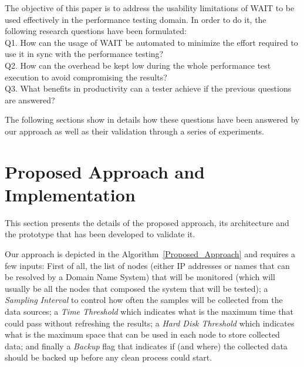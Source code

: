 \documentclass[runningheads,a4paper]{llncs}
\begin{document}
The objective of this paper is to address the usability limitations of WAIT to
be used effectively in the performance testing domain. In order to do it, the
following research questions have been formulated:
\\Q1. How can the usage of WAIT be automated to minimize the effort
required to use it in sync with the performance testing?
\\Q2. How can the overhead be kept low during the whole performance test
execution to avoid compromising the results? 
\\Q3. What benefits in productivity can a tester achieve if the previous
questions are answered?

The following sections show in details how these questions have been answered by
our approach as well as their validation through a series of experiments.


\section{Proposed Approach and Implementation}

This section presents the details of the proposed approach, its architecture
and the prototype that has been developed to validate it.

Our approach is depicted in the Algorithm~\ref{Proposed_Approach} and requires
a few inputs: First of all, the list of nodes (either IP addresses or names that
can be resolved by a Domain Name System) that will be monitored (which
will usually be all the nodes that composed the system that will be tested); a
\emph{Sampling Interval} to control how often the samples will be collected
from the data sources; a \emph{Time Threshold} which indicates what is the
maximum time that could pass without refreshing the results; a \emph{Hard Disk
Threshold} which indicates what is the maximum space that can be used in each
node to store collected data; and finally a \emph{Backup} flag that indicates if
(and where) the collected data should be backed up before any clean process could start.
\end{document}
